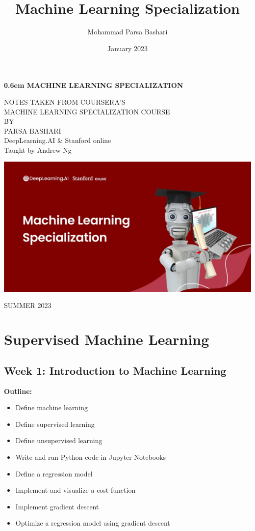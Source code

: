 \documentclass[a4paper, 12pt]{book}
\title{Machine Learning Specialization}
\author{Mohammad Parsa Bashari}
\date{January 2023}
\begin{document}
\thispagestyle{empty}
\newcommand\nbvspace[1][3]{\vspace*{\stretch{#1}}}
\newcommand\nbstretchyspace{\spaceskip0.5em plus 0.25em minus 0.25em}
\newcommand{\nbtitlestretch}{\spaceskip0.6em}
\begin{center}
\bfseries
\nbvspace[1]
\Huge
{\nbtitlestretch\huge
MACHINE LEARNING SPECIALIZATION}

\nbvspace[1]
\normalsize

NOTES TAKEN FROM COURSERA'S \\
MACHINE LEARNING SPECIALIZATION COURSE \\
\nbvspace[2]
\normalsize BY\\
\Large PARSA BASHARI\\[2em]
\footnotesize DeepLearning.AI \& Stanford online\\Taught by Andrew Ng

\nbvspace[3]

\includegraphics[width=6.5in]{graphics/cover.png}
\nbvspace[3]
\normalsize

SUMMER 2023\\
\nbvspace[1]
\end{center}

\tableofcontents
\chapter{Supervised Machine Learning}
 \section{Week 1: Introduction to Machine Learning}
\textbf{Outline:}
\begin{itemize}
    \item Define machine learning
    \item Define supervised learning
    \item Define unsupervised learning
    \item Write and run Python code in Jupyter Notebooks
    \item Define a regression model
    \item Implement and visualize a cost function
    \item Implement gradient descent
    \item Optimize a regression model using gradient descent
\end{itemize}
\end{document}
